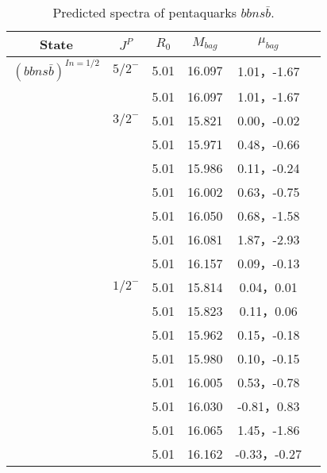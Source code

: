 \documentclass[prd,twocolumn,floatfix,nofootinbib]{revtex4}
\begin{document}
\renewcommand{\tabcolsep}{0.5cm}
\renewcommand{\arraystretch}{1.2}

\begin{table*}[!htbp]
    \caption{Predicted spectra of pentaquarks $bbns\bar{b}$.}
    \begin{tabular}{cccccc}
        \hline\hline
        {\rm State} &$J^{P}$ &$R_{0}$ &$M_{bag}$ &$\mu_{bag}$ \\ \hline
       ${(bbns\bar{b})}^{I{n}=1/2}$
            &${5/2}^{-}$     &5.01   &16.097 &1.01，-1.67  \\
                         &$ $     &5.01   &16.097 &1.01，-1.67  \\
            &${3/2}^{-}$     &5.01   &15.821 &0.00，-0.02  \\
                         &$ $     &5.01   &15.971 &0.48，-0.66  \\
                         &$ $     &5.01   &15.986 &0.11，-0.24  \\
                         &$ $     &5.01   &16.002 &0.63，-0.75 \\
                         &$ $     &5.01   &16.050 &0.68，-1.58  \\
                         &$ $     &5.01   &16.081 &1.87，-2.93  \\
                         &$ $     &5.01   &16.157 &0.09，-0.13  \\
            &${1/2}^{-}$     &5.01   &15.814 &0.04，0.01  \\
                         &$ $     &5.01   &15.823 &0.11，0.06  \\
                         &$ $     &5.01   &15.962 &0.15，-0.18  \\
                         &$ $     &5.01   &15.980 &0.10，-0.15  \\
                         &$ $     &5.01   &16.005 &0.53，-0.78  \\
                         &$ $     &5.01   &16.030 &-0.81，0.83  \\
                         &$ $     &5.01   &16.065 &1.45，-1.86 \\
                         &$ $     &5.01   &16.162 &-0.33，-0.27  \\
        \hline\hline
    \end{tabular}
\end{table*}
\end{document}
